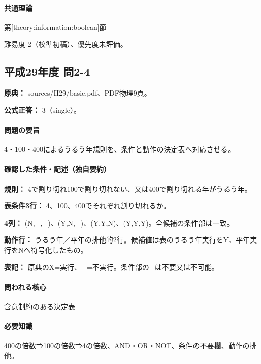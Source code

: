 \paragraph{共通理論} \hyperref[theory:information:boolean]{第\ref*{theory:information:boolean}節}

\par 難易度 2（校準初稿）、優先度未評価。

\subsection{平成29年度 問2-4}
\label{q:h29-reg-basic-2-4}

\noindent\textbf{原典：} sources/H29/basic.pdf、PDF物理9頁。

\textbf{公式正答：} 3（single）。

\paragraph{問題の要旨} 4・100・400によるうるう年規則を、条件と動作の決定表へ対応させる。

\paragraph{確認した条件・記述（独自要約）}\mbox{}\par

\noindent\textbf{規則：} 4で割り切れ100で割り切れない、又は400で割り切れる年がうるう年。\par

\noindent\textbf{表条件3行：} 4、100、400でそれぞれ割り切れるか。\par

\noindent\textbf{4列：} (N,−,−)、(Y,N,−)、(Y,Y,N)、(Y,Y,Y)。全候補の条件部は一致。\par

\noindent\textbf{動作行：} うるう年／平年の排他的2行。候補値は表のうるう年実行をY、平年実行をNへ符号化したもの。\par

\noindent\textbf{表記：} 原典のX=実行、−=不実行。条件部の−は不要又は不可能。\par

\paragraph{問われる核心} 含意制約のある決定表

\paragraph{必要知識} 400の倍数⇒100の倍数⇒4の倍数、AND・OR・NOT、条件の不要欄、動作の排他。

